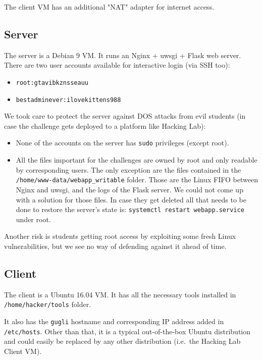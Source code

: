 \documentclass[11pt, a4paper]{article}
\begin{document}
  The client VM  has an additional "NAT" adapter for internet access.

\subsection{Server}
  The server is a Debian 9 VM. It runs an Nginx + uwsgi + Flask web server.
  There are two user accounts available for interactive login (via SSH too):
  \begin{itemize}
    \item \texttt{root:gtavibkznsseauu}
    \item \texttt{bestadminever:ilovekittens988}
  \end{itemize}

  We took care to protect the server against DOS attacks from evil students (in
  case the challenge gets deployed to a platform like Hacking Lab):
  \begin{itemize}
    \item None of the accounts on the server has \texttt{sudo} privileges (except root).
    \item All the files important for the challenges are owned by root and only
      readable by corresponding users. The only exception are the files contained
      in the \texttt{/home/www-data/webapp\_writable} folder. Those are the
      Linux FIFO between Nginx and uwsgi, and the logs of the Flask server. We could
      not come up with a solution for those files. In case they get deleted
      all that needs to be done to restore the server's state is:
      \texttt{systemctl restart webapp.service} under root.
  \end{itemize}

  Another risk is students getting root access by exploiting some fresh Linux
  vulnerabilities, but we see no way of defending against it ahead of time.

\subsection{Client}
  The client is a Ubuntu 16.04 VM. It has all the necessary tools installed in
  \texttt{/home/hacker/tools} folder.

  It also has the \texttt{gugli} hostname and corresponding IP address added in \texttt{/etc/hosts}.   
  Other than that, it is a typical out-of-the-box Ubuntu distribution and could easily be replaced
  by any other distribution (i.e.~the Hacking Lab Client VM).
\end{document}
